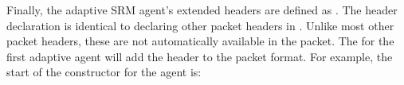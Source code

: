 Finally, the adaptive SRM agent's extended headers are defined as
.
The header declaration is identical to declaring other packet headers in \ns.
Unlike most other packet headers, 
these are not automatically available in the packet.
The
for the first adaptive agent
will add the header to the packet format.
For example, the start of the constructor for the
 agent is:


